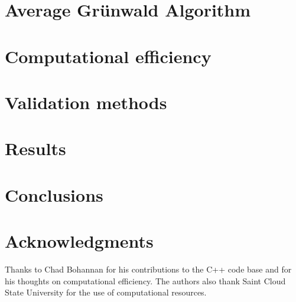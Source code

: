 \documentclass[preprint,12pt]{elsarticle}
\begin{document}

\section{Average Gr{\"u}nwald Algorithm}\label{sec:algorithmDefn}




\section{Computational efficiency}\label{sec:computation}



\section{Validation methods}\label{sec:methods}



\section{Results}\label{sec:bode}




\section{Conclusions}\label{conclusions}






\section*{Acknowledgments}

Thanks to Chad Bohannan for his contributions to the C++ code base and
for his thoughts on computational efficiency. The authors also thank
Saint Cloud State University for the use of computational resources.

\end{document}
